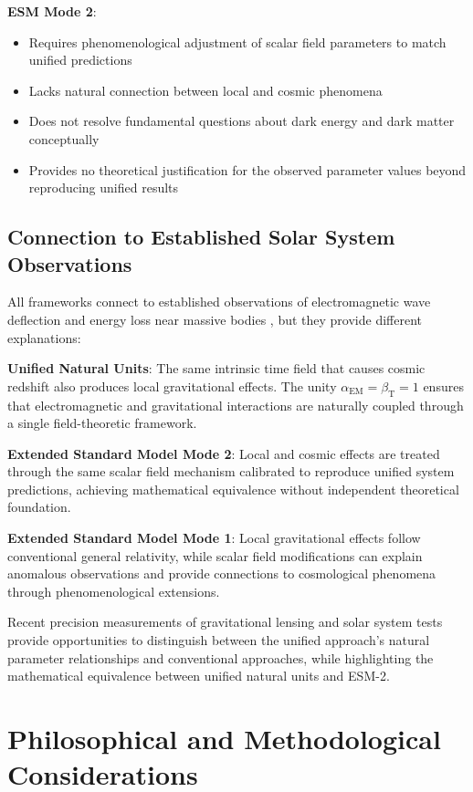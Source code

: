\documentclass[12pt,a4paper]{article}
\newcommand{\alphaEM}{\alpha_{\text{EM}}}
\newcommand{\betaT}{\beta_{\text{T}}}
\begin{document}
	\textbf{ESM Mode 2}:
	\begin{itemize}
		\item Requires phenomenological adjustment of scalar field parameters to match unified predictions
		\item Lacks natural connection between local and cosmic phenomena
		\item Does not resolve fundamental questions about dark energy and dark matter conceptually
		\item Provides no theoretical justification for the observed parameter values beyond reproducing unified results
	\end{itemize}
	
	\subsection{Connection to Established Solar System Observations}
	\label{subsec:solar_system_observations}
	
	All frameworks connect to established observations of electromagnetic wave deflection and energy loss near massive bodies \cite{Adams1925,Pound1960,Bertotti2003,Shapiro1971}, but they provide different explanations:
	
	\textbf{Unified Natural Units}: The same intrinsic time field that causes cosmic redshift also produces local gravitational effects. The unity $\alphaEM = \betaT = 1$ ensures that electromagnetic and gravitational interactions are naturally coupled through a single field-theoretic framework.
	
	\textbf{Extended Standard Model Mode 2}: Local and cosmic effects are treated through the same scalar field mechanism calibrated to reproduce unified system predictions, achieving mathematical equivalence without independent theoretical foundation.
	
	\textbf{Extended Standard Model Mode 1}: Local gravitational effects follow conventional general relativity, while scalar field modifications can explain anomalous observations and provide connections to cosmological phenomena through phenomenological extensions.
	
	Recent precision measurements of gravitational lensing and solar system tests \cite{Bolton2008,Suyu2017} provide opportunities to distinguish between the unified approach's natural parameter relationships and conventional approaches, while highlighting the mathematical equivalence between unified natural units and ESM-2.
	
	\section{Philosophical and Methodological Considerations}
	\label{sec:philosophical_considerations}
	
\end{document}

